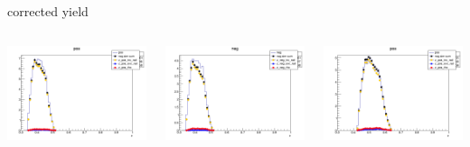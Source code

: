 \begin{frame}{corrected yield}
\begin{columns}
\begin{column}[T]{0.25\textwidth}
\includegraphics[width = \textwidth]{results/yield/statistics_corr/yield_x_Q2_z_0.50_5.500_0.40_pos.png}
\end{column}
\begin{column}[T]{0.25\textwidth}
\includegraphics[width = \textwidth]{results/yield/statistics_corr/yield_x_Q2_z_0.50_5.500_0.40_neg.png}
\end{column}
\begin{column}[T]{0.25\textwidth}
\includegraphics[width = \textwidth]{results/yield/statistics_corr/yield_x_Q2_z_0.50_5.500_0.50_pos.png}

\end{column}
\end{columns}
\end{frame}
